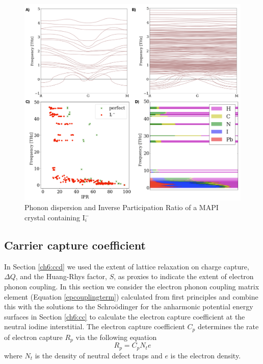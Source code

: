 {\begin{figure}[h!]   
\centering
  \includegraphics[width=1.0\columnwidth]{figures/ch6/defect_dispersion_IPR.png}
  \caption[Phonon dispersion and Inverse Participation Ratio of a MAPI crystal containing $\mathbf{I}_i^{-}$]{Phonon dispersion and Inverse Participation Ratio of a MAPI crystal containing $\mathrm{I}_i^{-}$}
\label{defect_dispersion_IPR}
\end{figure}

\subsection{Carrier capture coefficient} \label{finalsection}

In Section \ref{ch6:ccd} we used the extent of lattice relaxation on charge capture, $\Delta Q$, and the Huang-Rhys factor, $S$, as proxies to indicate the extent of electron phonon coupling. In this section we consider the electron phonon coupling matrix element (Equation \ref{epcouplingterm}) calculated from first principles and combine this with the solutions to the Schro\"{o}dinger for the anharmonic potential energy surfaces in Section \ref{ch6:cc} to calculate the electron capture coefficient at the neutral iodine interstitial. The electron capture coefficient $C_p$ determines the rate of electron capture $R_p$ via the following equation
\begin{equation}
R_p=C_pN_te
\end{equation}
where $N_t$ is the density of neutral defect traps and $e$ is the electron density.

}
